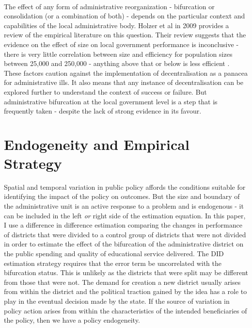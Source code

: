 \documentclass[12pt, a4paper]{article}
\begin{document}
\paragraph{}  The effect of any form of administrative reorganization - bifurcation or consolidation (or a combination of both) - depends on the particular context and capabilities of the local administrative body. Holzer et al in 2009 provides a review of the empirical literature on this question. Their review suggests that the evidence on the effect of size on local government performance is inconclusive - there is very little correlation between size and efficiency for population sizes between 25,000 and 250,000 - anything above that or below is less efficient \parencite{holzer2009literature}. These factors caution against the implementation of decentralisation as a panacea for administrative ills. It also means that any instance of decentralisation can be explored further to understand the context of success or failure. But administrative bifurcation at the local government level is a step that is frequently taken - despite the lack of strong evidence in its favour. 
	
\section*{Endogeneity and Empirical Strategy}
\paragraph{} Spatial and temporal variation in public policy affords the conditions suitable for identifying the impact of the policy on outcomes. But the size and boundary of the administrative unit is an active response to a problem and is endogenous - it can be included in the left \textit{or} right side of the estimation equation. In this paper, I use a difference in difference estimation comparing the changes in performance of districts that were divided to a control group of districts that were not divided in order to estimate the effect of the bifurcation of the administrative district on the public spending and quality of educational service delivered. The DID estimation strategy requires that the error term be uncorrelated with the bifurcation status. This is unlikely as the districts that were split may be different from those that were not. The demand for creation a new district usually arises from within the district and the political traction gained by the idea has a role to play in the eventual decision made by the state. If the source of variation in policy action arises from within the characteristics of the intended beneficiaries of the policy, then we have a policy endogeneity. 
	
\end{document}
